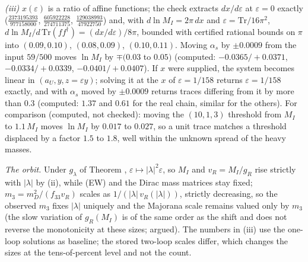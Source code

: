 \emph{(iii)} $x(\varepsilon)$ is a ratio of affine functions; the check extracts $dx/d\varepsilon$ at $\varepsilon = 0$ exactly ($\tfrac{2373195393}{977158000}$, $\tfrac{605922228}{274711375}$, $\tfrac{129038993}{47922750}$) and, with $d\ln M_{I} = 2\pi\,dx$ and $\varepsilon = \mathrm{Tr}/16\pi^{2}$, $d\ln M_{I}/d\,\mathrm{Tr}(ff^{\dagger}) = (dx/d\varepsilon)/8\pi$, bounded with certified rational bounds on $\pi$ into $(0.09, 0.10)$, $(0.08, 0.09)$, $(0.10, 0.11)$. Moving $\alpha_{s}$ by $\pm 0.0009$ from the input $59/500$ moves $\ln M_{I}$ by $\mp(0.03$ to $0.05)$ (computed: $-0.0365/+0.0371$, $-0.0334/+0.0339$, $-0.0401/+0.0407$). If $x$ were supplied, the system becomes linear in $(a_{U}, y, z = \varepsilon y)$; solving it at the $x$ of $\varepsilon = 1/158$ returns $\varepsilon = 1/158$ exactly, and with $\alpha_{s}$ moved by $\pm 0.0009$ returns traces differing from it by more than $0.3$ (computed: $1.37$ and $0.61$ for the real chain, similar for the others). For comparison (computed, not checked): moving the $(10,1,3)$ threshold from $M_{I}$ to $1.1\,M_{I}$ moves $\ln M_{I}$ by $0.017$ to $0.027$, so a unit trace matches a threshold displaced by a factor $1.5$ to $1.8$, well within the unknown spread of the heavy masses.

\emph{The orbit.} Under $g_{\lambda}$ of Theorem , $\varepsilon \mapsto |\lambda|^{2}\varepsilon$, so $M_{I}$ and $v_{R} = M_{I}/g_{R}$ rise strictly with $|\lambda|$ by (ii), while (EW) and the Dirac mass matrices stay fixed; $m_{3} = m_{D}^{2}/(f_{33}v_{R})$ scales as $1/(|\lambda|\,v_{R}(|\lambda|))$, strictly decreasing, so the observed $m_{3}$ fixes $|\lambda|$ uniquely and the Majorana scale remains valued only by $m_{3}$ (the slow variation of $g_{R}(M_{I})$ is of the same order as the shift and does not reverse the monotonicity at these sizes; argued). The numbers in (iii) use the one-loop solutions as baseline; the stored two-loop scales differ, which changes the sizes at the tens-of-percent level and not the count.

